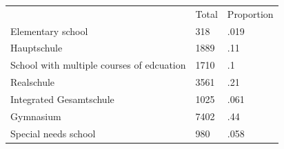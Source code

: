 \documentclass{article}
\begin{document}
\begin{table}[!h]
\centering
\begin{tabular}{lll}
\cline{1-3}
\multicolumn{1}{|l}{} &
  \multicolumn{1}{|l}{Total} &
  \multicolumn{1}{|l|}{Proportion} \\
\cline{1-3}
\multicolumn{1}{|l}{Elementary school} &
  \multicolumn{1}{|l}{318} &
  \multicolumn{1}{|l|}{.019} \\
\cline{1-3}
\multicolumn{1}{|l}{Hauptschule} &
  \multicolumn{1}{|l}{1889} &
  \multicolumn{1}{|l|}{.11} \\
\cline{1-3}
\multicolumn{1}{|l}{School with multiple courses of edcuation} &
  \multicolumn{1}{|l}{1710} &
  \multicolumn{1}{|l|}{.1} \\
\cline{1-3}
\multicolumn{1}{|l}{Realschule} &
  \multicolumn{1}{|l}{3561} &
  \multicolumn{1}{|l|}{.21} \\
\cline{1-3}
\multicolumn{1}{|l}{Integrated Gesamtschule} &
  \multicolumn{1}{|l}{1025} &
  \multicolumn{1}{|l|}{.061} \\
\cline{1-3}
\multicolumn{1}{|l}{Gymnasium} &
  \multicolumn{1}{|l}{7402} &
  \multicolumn{1}{|l|}{.44} \\
\cline{1-3}
\multicolumn{1}{|l}{Special needs school} &
  \multicolumn{1}{|l}{980} &
  \multicolumn{1}{|l|}{.058} \\
\cline{1-3}
\end{tabular}
\end{table}
\end{document}

